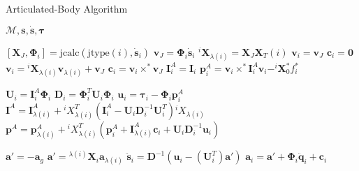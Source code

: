 \begin{algorithm}[h]
    \caption{Articulated-Body Algorithm}
    \label{alg:aba}
    \begin{algorithmic}[1]
        \Require $\mathcal{M}, \mathbf{s}, \dot{\mathbf{s}}, \boldsymbol{\tau}$

        \State $[\mathbf{X}_J, \boldsymbol{\Phi}_i] = \text{jcalc}(\text{jtype}(i), \dot{\mathbf{s}}_i)$
        \State $\mathrm{\mathbf{v}}_J = \boldsymbol{\Phi}_i \dot{\mathbf{s}}_i$
        \State $^i\mathbf{X}_{\lambda(i)} = \mathbf{X}_J\mathbf{X}_T (i)$
        \State $\mathrm{\mathbf{v}}_i = \mathrm{\mathbf{v}}_J$
        \State $\mathbf{c}_i = \mathbf{0}$
        \Else
        \State $\mathrm{\mathbf{v}}_i = {}^i\mathbf{X} _{\lambda(i)}\mathrm{\mathbf{v}}_{\lambda(i)} + \mathrm{\mathbf{v}}_J$
        \State $\mathbf{c}_i = \mathrm{\mathbf{v}}_i \times ^* \mathrm{\mathbf{v}}_J$
        \EndIf
        \State $\mathbf{I}_i ^A = \mathbf{I}_i$
        \State $\mathbf{p}_i ^A = \mathrm{\mathbf{v}}_i \times^* \mathbf{I}_i ^A \mathrm{\mathbf{v}}_i - ^i\mathbf{X} _0 ^* f ^* _i $
        \EndFor

        \State $\mathbf{U}_i = \mathbf{I}_i ^A \boldsymbol{\Phi}_i$
        \State $\mathbf{D} _i = \boldsymbol{\Phi} ^T _i  {} \mathbf{U} _i \boldsymbol{\Phi} _i $
        \State $\mathbf{u}_i = \boldsymbol{\tau}_i - \boldsymbol{\Phi}_i\mathbf{p}_i^A$
        \State $\mathbf{I} ^A = \mathbf{I} ^A _{\lambda (i)} + {} ^i X _{\lambda (i)} ^T (\mathbf{I} _i ^A - {}  \mathbf{U} _i  \mathbf{D} ^{-1} _i  {}  \mathbf{U} ^T _i) {} ^i X _{\lambda (i)} $
        \State $\mathbf{p} ^A = \mathbf{p} ^A _{\lambda (i)} + {} ^i X _{\lambda (i)} ^T (\mathbf{p} ^A_i + \mathbf{I} ^A _{\lambda (i)}  \mathbf{c}_i + {}  \mathbf{U} _i \mathbf{D} ^{-1} _i {} \mathbf{u} _i) $
        \EndIf
        \EndFor

        \State $\mathbf{a}' = -\mathbf{a}_g$
        \Else
        \State $\mathbf{a}' = {}^{\lambda(i)}\mathbf{X}_i \mathbf{a}_{\lambda(i)}$
        \State $\ddot{\mathbf{s}}_i = \mathbf{D}^{-1} (\mathbf{u}_i - (\mathbf{U}_i^T)\mathbf{a}')$
        \State $\mathbf{a}_i = \mathbf{a}' + \boldsymbol{\Phi}_i\mathbf{\ddot{q}}_i + \mathbf{c} _i$
        \EndIf
        \EndFor
    \end{algorithmic}
\end{algorithm}